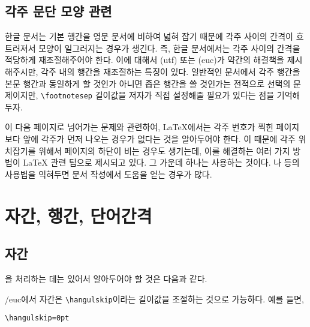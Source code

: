 \begin{itemize}
\end{itemize}

\subsection{각주 문단 모양 관련}

한글 문서는 기본 행간을 영문 문서에 비하여 넓혀 잡기 때문에 각주 사이의
간격이 흐트러져서 모양이 일그러지는 경우가 생긴다. 즉, 한글 문서에서는
각주 사이의 간격을 적당하게 재조절해주어야 한다. 이에 대해서 (utf) 또는 (euc)가 약간의 해결책을
제시해주시만, 각주 내의 행간을 재조절하는 특징이 있다.
일반적인 문서에서 각주 행간을 본문 행간과 동일하게 할 것인가 아니면
좁은 행간을 쓸 것인가는 전적으로 선택의 문제이지만, \verb|\footnotesep|
길이값을 저자가 직접 설정해줄 필요가 있다는 점을 기억해두자. 

이 다음 페이지로 넘어가는 문제와 관련하여, \LaTeX 에서는
각주 번호가 찍힌 페이지보다 앞에 각주가 먼저 나오는 경우가 없다는
것을 알아두어야 한다. 이 때문에 각주 위치잡기를 위해서 페이지의
하단이 비는 경우도 생기는데, 이를 해결하는 여러 가지 방법이 \LaTeX{}
관련 팁으로 제시되고 있다. 그 가운데 하나는 \를
사용하는 것이다. 
나  등의 사용법을 익혀두면 문서 작성에서
도움을 얻는 경우가 많다. 

\section{자간, 행간, 단어간격}

\subsection{자간}

을 처리하는 데는 있어서 알아두어야 할 것은 다음과 같다.

\kotex/euc에서 자간은 \verb|\hangulskip|이라는 길이값을 조절하는
것으로 가능하다. 예를 들면,
\begin{verbatim}
\hangulskip=0pt
\end{verbatim}

